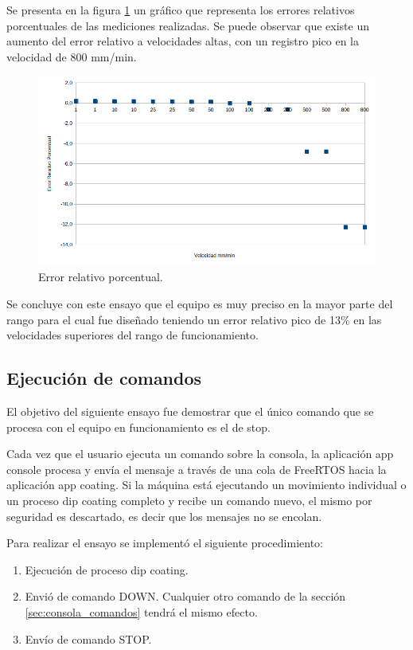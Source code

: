 Se presenta en la figura \ref{fig:error_porcentual_1} un gráfico que representa los errores relativos porcentuales de las mediciones realizadas. Se puede observar que existe un aumento del error relativo a velocidades altas, con un registro pico  en la velocidad de 800 mm/min. 


\begin{figure}[h!]
\centering 
\includegraphics[width=1\textwidth]{./Figures/error.png}
\caption{Error relativo porcentual.}
\label{fig:error_porcentual_1}
\end{figure}
Se concluye con este ensayo que el equipo es muy preciso en la mayor parte del rango para el cual fue diseñado teniendo un error relativo pico de 13\% en las velocidades superiores del rango de funcionamiento.
 
 
\subsection{Ejecución de comandos}

El objetivo del siguiente ensayo fue demostrar que el único comando que se procesa con el equipo en funcionamiento es el de stop.

Cada vez que el usuario ejecuta un comando sobre la consola, la aplicación app console procesa y envía el mensaje a través de una cola de FreeRTOS hacia la aplicación app coating. Si la máquina está ejecutando un movimiento individual o un proceso dip coating completo y recibe un comando nuevo, el mismo por seguridad es descartado, es decir que los mensajes no se encolan. 

Para realizar el ensayo se implementó el siguiente procedimiento:
\begin{enumerate}
\item Ejecución de proceso  dip coating.
\item Envió de comando DOWN. Cualquier otro comando de la sección \ref{sec:consola_comandos} tendrá el mismo efecto.
\item Envío de comando STOP.
\end{enumerate}


